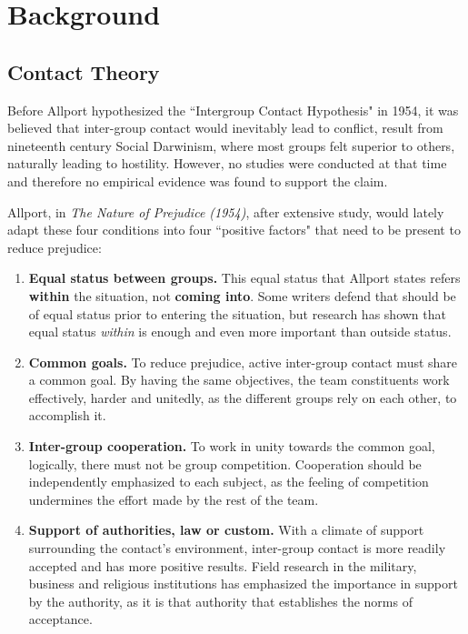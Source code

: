 
\section{Background}
\label{sec: backg}

\subsection{Contact Theory}
\par Before Allport hypothesized the ``Intergroup Contact Hypothesis" in 1954, it was believed that inter-group contact would inevitably lead to conflict, result from nineteenth century Social Darwinism, where most groups felt superior to others, naturally leading to hostility. However, no studies were conducted at that time and therefore no empirical evidence was found to support the claim. \cite{pettigrew_1998} 
\par Allport, in \textit{The Nature of Prejudice (1954)}, after extensive study, would lately adapt these four conditions into four ``positive factors" that need to be present to reduce prejudice:

\begin{enumerate}
\item \textbf{Equal status between groups.} This equal status that Allport states refers \textbf{within} the situation, not \textbf{coming into}. Some writers defend that should be of equal status prior to entering the situation, but research has shown that equal status \textit{within} is enough and even more important than outside status.
\item \textbf{Common goals.} To reduce prejudice, active inter-group contact must share a common goal. By having the same objectives, the team constituents work effectively, harder and unitedly, as the different groups rely on each other, to accomplish it.
\item \textbf{Inter-group cooperation.} To work in unity towards the common goal, logically, there must not be group competition. Cooperation should be independently emphasized to each subject, as the feeling of competition undermines the effort made by the rest of the team.
\item \textbf{Support of authorities, law or custom.} With a climate of support surrounding the contact's environment, inter-group contact is more readily accepted and has more positive results. Field research in the military, business and religious institutions has emphasized the importance in support by the authority, as it is that authority that establishes the norms of acceptance.
\end{enumerate}

